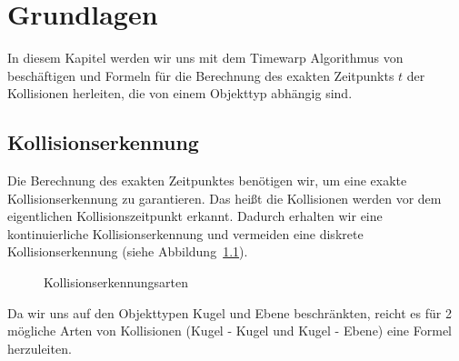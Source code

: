 \documentclass[a4paper, 10pt, openright, parskip, chapterprefix]{scrreprt}
\begin{document}
\newpage
\mbox{}
\thispagestyle{empty}
\newpage
\clearpage
\setcounter{page}{2}
\tableofcontents
\listoffigures
\newpage



\chapter{Grundlagen}
In diesem Kapitel werden wir uns mit dem Timewarp Algorithmus von~\cite{timewarp} beschäftigen und
Formeln für die Berechnung des exakten Zeitpunkts $t$ der Kollisionen herleiten, die von einem 
Objekttyp abhängig sind.

\section{Kollisionserkennung}
\label{sec:Kollisionserkennung}
Die Berechnung des exakten Zeitpunktes benötigen wir, um eine exakte Kollisionserkennung zu garantieren. Das heißt die Kollisionen werden vor dem eigentlichen Kollisionszeitpunkt erkannt. Dadurch erhalten wir eine kontinuierliche Kollisionserkennung und vermeiden eine diskrete Kollisionserkennung (siehe Abbildung~\ref{abb:kollkondis}).

\begin{figure}[h!]
\centering{}
\caption{Kollisionserkennungsarten}
\label{abb:kollkondis}
\end{figure}

Da wir uns auf den Objekttypen Kugel und Ebene beschränkten, reicht es für 2 mögliche Arten von Kollisionen 
(Kugel - Kugel und Kugel - Ebene) eine Formel herzuleiten.\\
\end{document}
